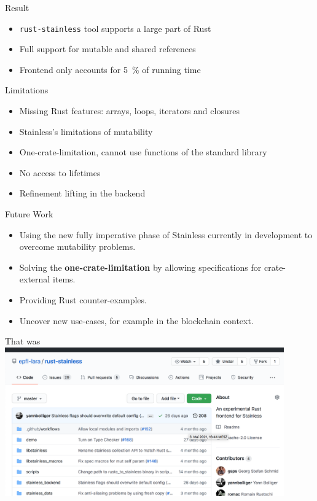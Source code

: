 \begin{frame}{Result}
\begin{itemize}
  \item \texttt{rust-stainless} tool supports a large part of Rust
  \item Full support for mutable and shared references
  \item Frontend only accounts for 5~\% of running time
\end{itemize}
\end{frame}

\begin{frame}[fragile]{Limitations}
\begin{itemize}
\item Missing Rust features: arrays, loops, iterators and closures
\item Stainless's limitations of mutability
\item One-crate-limitation, cannot use functions of the standard library
\item \color{gray} No access to lifetimes
\item Refinement lifting in the backend
\end{itemize}
\end{frame}

\begin{frame}{Future Work}
\begin{itemize}
  \item Using the new fully imperative phase of Stainless currently in
  development to overcome mutability problems.

  \item Solving the \textbf{one-crate-limitation} by allowing specifications
  for crate-external items.

  \item Providing Rust counter-examples.

  \item Uncover new use-cases, for example in the blockchain context.
\end{itemize}
\end{frame}

\begin{frame}{That was}
\centering
\includegraphics[width=0.9\textwidth]{img/github.png}
\end{frame}

